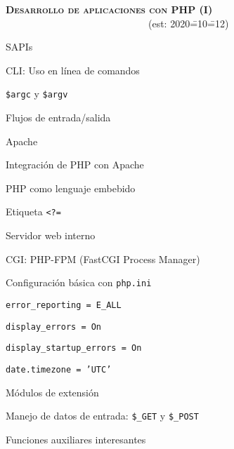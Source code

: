 \begin{longenum}
    \item \textbf{\textsc{Desarrollo de aplicaciones con PHP (I)}} \ \ \ \ \ \ \ \ \ \ \ \ \ \ \ \ \ \ \ \ \ \ \ \ \ \ \ \ \ (est: 2020\==10\==12)
    \begin{longenum}
        \item SAPIs
        \begin{longenum}
            \item CLI: Uso en línea de comandos
            \begin{longenum}
                \item \texttt{\$argc} y \texttt{\$argv}
                \item Flujos de entrada/salida \opcional\
            \end{longenum}
            \item Apache \opcional\
            \begin{longenum}
                \item Integración de PHP con Apache 
                \item PHP como lenguaje embebido
                \item Etiqueta \texttt{<?=}
                \item Servidor web  interno
            \end{longenum}
            \item CGI: PHP-FPM (FastCGI Process Manager)
            \item Configuración básica con \texttt{php.ini}
            \begin{longenum}
                \item \texttt{error\_reporting = E\_ALL}
                \item \texttt{display\_errors = On}
                \item \texttt{display\_startup\_errors = On}
                \item \texttt{date.timezone = 'UTC'}
            \end{longenum}
            \item Módulos de extensión
        \end{longenum}
        \item Manejo de datos de entrada: \texttt{\$\_GET} y \texttt{\$\_POST}
        \item Funciones auxiliares interesantes

\end{longenum}
\end{longenum}
